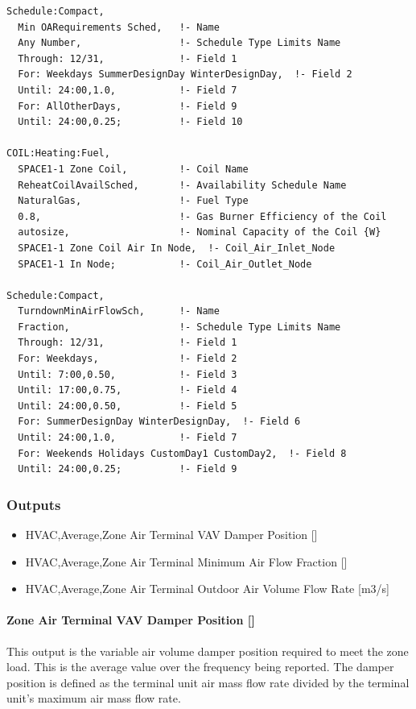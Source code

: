 \begin{lstlisting}
Schedule:Compact,
  Min OARequirements Sched,   !- Name
  Any Number,                 !- Schedule Type Limits Name
  Through: 12/31,             !- Field 1
  For: Weekdays SummerDesignDay WinterDesignDay,  !- Field 2
  Until: 24:00,1.0,           !- Field 7
  For: AllOtherDays,          !- Field 9
  Until: 24:00,0.25;          !- Field 10

COIL:Heating:Fuel,
  SPACE1-1 Zone Coil,         !- Coil Name
  ReheatCoilAvailSched,       !- Availability Schedule Name
  NaturalGas,                 !- Fuel Type
  0.8,                        !- Gas Burner Efficiency of the Coil
  autosize,                   !- Nominal Capacity of the Coil {W}
  SPACE1-1 Zone Coil Air In Node,  !- Coil_Air_Inlet_Node
  SPACE1-1 In Node;           !- Coil_Air_Outlet_Node

Schedule:Compact,
  TurndownMinAirFlowSch,      !- Name
  Fraction,                   !- Schedule Type Limits Name
  Through: 12/31,             !- Field 1
  For: Weekdays,              !- Field 2
  Until: 7:00,0.50,           !- Field 3
  Until: 17:00,0.75,          !- Field 4
  Until: 24:00,0.50,          !- Field 5
  For: SummerDesignDay WinterDesignDay,  !- Field 6
  Until: 24:00,1.0,           !- Field 7
  For: Weekends Holidays CustomDay1 CustomDay2,  !- Field 8
  Until: 24:00,0.25;          !- Field 9
\end{lstlisting}

\subsubsection{Outputs}\label{outputs-2-000}

\begin{itemize}
\item
  HVAC,Average,Zone Air Terminal VAV Damper Position {[]}
\item
  HVAC,Average,Zone Air Terminal Minimum Air Flow Fraction {[]}
\item
  HVAC,Average,Zone Air Terminal Outdoor Air Volume Flow Rate {[}m3/s{]}
\end{itemize}

\paragraph{Zone Air Terminal VAV Damper Position {[]}}\label{zone-air-terminal-vav-damper-position}

This output is the variable air volume damper position required to meet the zone load. This is the average value over the frequency being reported. The damper position is defined as the terminal unit air mass flow rate divided by the terminal unit's maximum air mass flow rate.

